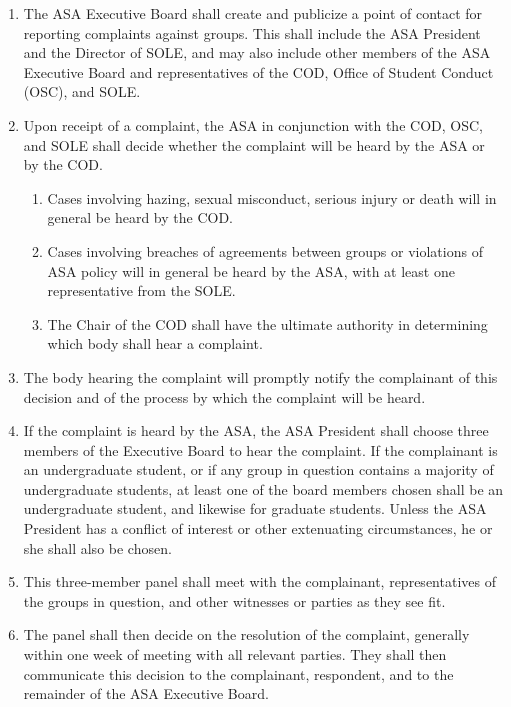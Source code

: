 \documentclass[12pt]{article}
\begin{document}
\begin{enumerate}
    \item The ASA Executive Board shall create and publicize a point of contact for reporting
complaints against groups. This shall include the ASA President and the Director of SOLE,
and may also include other members of the ASA Executive Board and representatives of
the COD, Office of Student Conduct (OSC), and SOLE.
    \item Upon receipt of a complaint, the ASA in conjunction with the COD, OSC, and SOLE shall
decide whether the complaint will be heard by the ASA or by the COD.
    \begin{enumerate}[noitemsep, label=\arabic*.]
        \item Cases involving hazing, sexual misconduct, serious injury or death will in general
be heard by the COD.
        \item Cases involving breaches of agreements between groups or violations of ASA policy
will in general be heard by the ASA, with at least one representative from the SOLE.
        \item The Chair of the COD shall have the ultimate authority in determining which body
shall hear a complaint.
    \end{enumerate}

    \item The body hearing the complaint will promptly notify the complainant of this decision and of
the process by which the complaint will be heard.
    \item If the complaint is heard by the ASA, the ASA President shall choose three members of the
Executive Board to hear the complaint. If the complainant is an undergraduate student, or if
any group in question contains a majority of undergraduate students, at least one of the
board members chosen shall be an undergraduate student, and likewise for graduate
students. Unless the ASA President has a conflict of interest or other extenuating
circumstances, he or she shall also be chosen.
    \item This three-member panel shall meet with the complainant, representatives of the groups
in question, and other witnesses or parties as they see fit.
    \item The panel shall then decide on the resolution of the complaint, generally within one week of
meeting with all relevant parties. They shall then communicate this decision to the
complainant, respondent, and to the remainder of the ASA Executive Board.
\end{enumerate}
\end{document}
